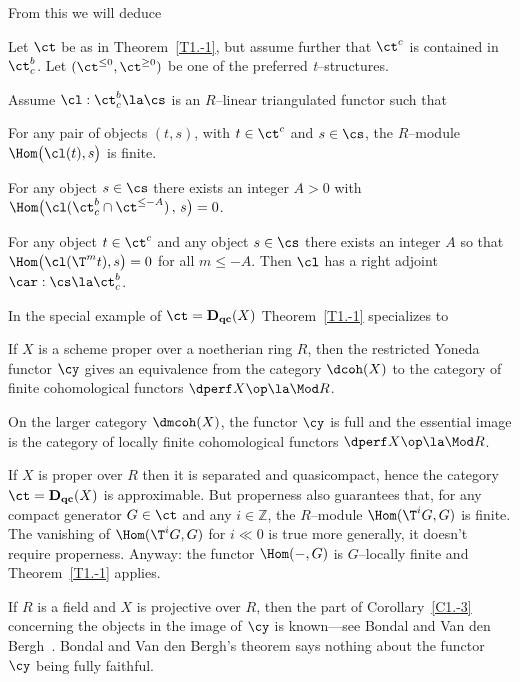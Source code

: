 \documentclass[11pt]{amsart}
\newcommand{\zz}{{\mathbb Z}}
\newcommand{\Dqc}{{\mathbf D_{\text{\bf qc}}}}
\begin{document}
\nin
From this we will deduce

Let $\ct$ be as in Theorem~\ref{T1.-1},
but assume further that $\ct^c$ is contained in $\ct^b_c$.
Let $(\ct^{\leq0},\ct^{\geq0})$ be one of
the preferred {\it t}--structures.

Assume $\cl:\ct^b_c\la\cs$ is an
$R$--linear triangulated functor such that 
\be
\item
  For any pair of objects $(t,s)$, with $t\in\ct^c$ and $s\in\cs$,
  the $R$--module
  $\Hom\big(\cl(t),s\big)$ is finite.
\item
  For any object $s\in\cs$ there exists an integer $A>0$ with
  $\Hom\big(\cl(\ct^b_c\cap\ct^{\leq-A})\,,\,s\big)=0$.
\item
  For any object $t\in\ct^c$ and any object $s\in\cs$ there exists an integer
  $A$ so that $\Hom\big(\cl(\T^mt),s\big)=0$ for all $m\leq-A$.
\ee
Then $\cl$ has a right adjoint $\car:\cs\la\ct^b_c$.
\ecor

\nin
In the special example of $\ct=\Dqc(X)$ Theorem~\ref{T1.-1} specializes to

If $X$ is a scheme proper over a noetherian
ring $R$,
then the restricted Yoneda functor $\cy$ gives  an equivalence from the category
$\dcoh(X)$ to the category of finite cohomological functors
${\dperf X}\op\la\Mod R$.

On the larger category $\dmcoh(X)$, the functor $\cy$
is full and the essential image is the category of locally finite
cohomological functors ${\dperf X}\op\la\Mod R$.
\ecor



\prf
If $X$ is proper over $R$ then it is separated and quasicompact,
hence the category $\ct=\Dqc(X)$ is approximable.
But properness also guarantees that, for any compact
generator $G\in\ct$ and any $i\in\zz$, the $R$--module
$\Hom(\T^iG,G)$ is finite. The vanishing
of $\Hom(\T^iG,G)$ for $i\ll0$ is true more generally,
it doesn't require properness. Anyway: the functor $\Hom(-,G)$
is $G$--locally finite and
Theorem~\ref{T1.-1} applies.
\eprf

If $R$ is a field and $X$ is projective over $R$, then the
part of 
Corollary~\ref{C1.-3} concerning
the objects in the image of $\cy$ is
known---see Bondal and Van den Bergh~\cite[Theorem~A.1]{BondalvandenBergh04}.
Bondal and Van den Bergh's
theorem says nothing about the functor $\cy$ being fully faithful.
\end{document}
